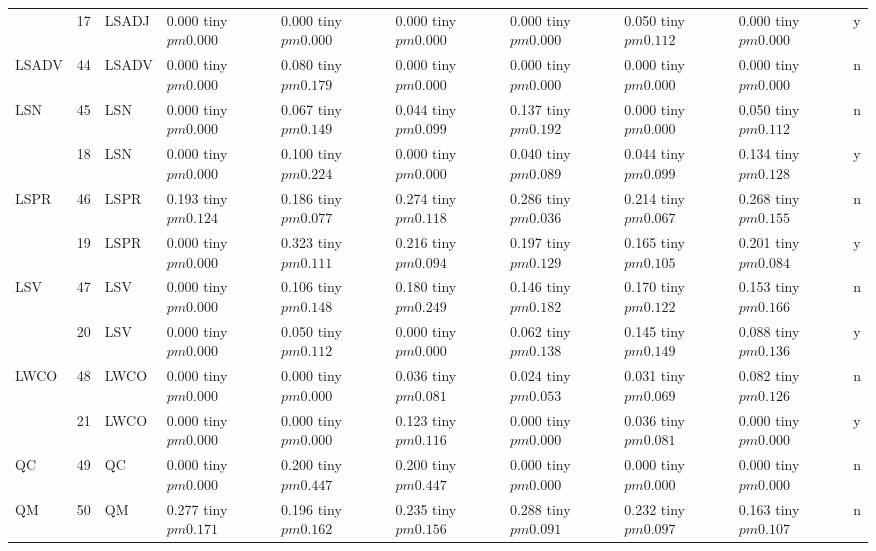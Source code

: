\begin{table}
\begin{tabular}{llllllllll}
 & 17 & LSADJ & 0.000 tiny $ pm 0.000$ & 0.000 tiny $ pm 0.000$ & 0.000 tiny $ pm 0.000$ & 0.000 tiny $ pm 0.000$ & 0.050 tiny $ pm 0.112$ & 0.000 tiny $ pm 0.000$ & y \\
\cline{1-10}
LSADV & 44 & LSADV & 0.000 tiny $ pm 0.000$ & 0.080 tiny $ pm 0.179$ & 0.000 tiny $ pm 0.000$ & 0.000 tiny $ pm 0.000$ & 0.000 tiny $ pm 0.000$ & 0.000 tiny $ pm 0.000$ & n \\
\cline{1-10}
\multirow[t]{2}{*}{LSN} & 45 & LSN & 0.000 tiny $ pm 0.000$ & 0.067 tiny $ pm 0.149$ & 0.044 tiny $ pm 0.099$ & 0.137 tiny $ pm 0.192$ & 0.000 tiny $ pm 0.000$ & 0.050 tiny $ pm 0.112$ & n \\
 & 18 & LSN & 0.000 tiny $ pm 0.000$ & 0.100 tiny $ pm 0.224$ & 0.000 tiny $ pm 0.000$ & 0.040 tiny $ pm 0.089$ & 0.044 tiny $ pm 0.099$ & 0.134 tiny $ pm 0.128$ & y \\
\cline{1-10}
\multirow[t]{2}{*}{LSPR} & 46 & LSPR & 0.193 tiny $ pm 0.124$ & 0.186 tiny $ pm 0.077$ & 0.274 tiny $ pm 0.118$ & 0.286 tiny $ pm 0.036$ & 0.214 tiny $ pm 0.067$ & 0.268 tiny $ pm 0.155$ & n \\
 & 19 & LSPR & 0.000 tiny $ pm 0.000$ & 0.323 tiny $ pm 0.111$ & 0.216 tiny $ pm 0.094$ & 0.197 tiny $ pm 0.129$ & 0.165 tiny $ pm 0.105$ & 0.201 tiny $ pm 0.084$ & y \\
\cline{1-10}
\multirow[t]{2}{*}{LSV} & 47 & LSV & 0.000 tiny $ pm 0.000$ & 0.106 tiny $ pm 0.148$ & 0.180 tiny $ pm 0.249$ & 0.146 tiny $ pm 0.182$ & 0.170 tiny $ pm 0.122$ & 0.153 tiny $ pm 0.166$ & n \\
 & 20 & LSV & 0.000 tiny $ pm 0.000$ & 0.050 tiny $ pm 0.112$ & 0.000 tiny $ pm 0.000$ & 0.062 tiny $ pm 0.138$ & 0.145 tiny $ pm 0.149$ & 0.088 tiny $ pm 0.136$ & y \\
\cline{1-10}
\multirow[t]{2}{*}{LWCO} & 48 & LWCO & 0.000 tiny $ pm 0.000$ & 0.000 tiny $ pm 0.000$ & 0.036 tiny $ pm 0.081$ & 0.024 tiny $ pm 0.053$ & 0.031 tiny $ pm 0.069$ & 0.082 tiny $ pm 0.126$ & n \\
 & 21 & LWCO & 0.000 tiny $ pm 0.000$ & 0.000 tiny $ pm 0.000$ & 0.123 tiny $ pm 0.116$ & 0.000 tiny $ pm 0.000$ & 0.036 tiny $ pm 0.081$ & 0.000 tiny $ pm 0.000$ & y \\
\cline{1-10}
QC & 49 & QC & 0.000 tiny $ pm 0.000$ & 0.200 tiny $ pm 0.447$ & 0.200 tiny $ pm 0.447$ & 0.000 tiny $ pm 0.000$ & 0.000 tiny $ pm 0.000$ & 0.000 tiny $ pm 0.000$ & n \\
\cline{1-10}
\multirow[t]{2}{*}{QM} & 50 & QM & 0.277 tiny $ pm 0.171$ & 0.196 tiny $ pm 0.162$ & 0.235 tiny $ pm 0.156$ & 0.288 tiny $ pm 0.091$ & 0.232 tiny $ pm 0.097$ & 0.163 tiny $ pm 0.107$ & n \\

\end{tabular}
\end{table}
